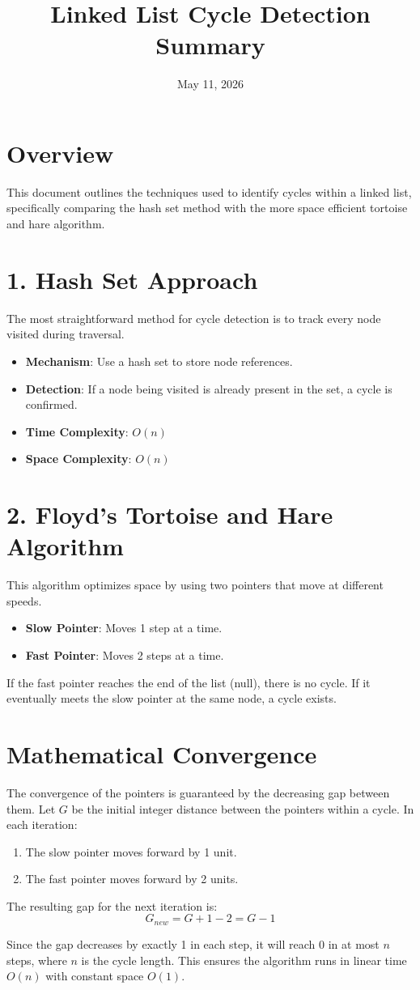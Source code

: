 \documentclass{article}
\begin{document}
\title{Linked List Cycle Detection Summary}
\author{}
\date{May 11, 2026}
\maketitle

\section*{Overview}
This document outlines the techniques used to identify cycles within a linked list, specifically comparing the hash set method with the more space efficient tortoise and hare algorithm.

\section*{1. Hash Set Approach}
The most straightforward method for cycle detection is to track every node visited during traversal.
\begin{itemize}
    \item \textbf{Mechanism}: Use a hash set to store node references.
    \item \textbf{Detection}: If a node being visited is already present in the set, a cycle is confirmed.
    \item \textbf{Time Complexity}: $O(n)$
    \item \textbf{Space Complexity}: $O(n)$
\end{itemize}

\section*{2. Floyd's Tortoise and Hare Algorithm}
This algorithm optimizes space by using two pointers that move at different speeds.
\begin{itemize}
    \item \textbf{Slow Pointer}: Moves 1 step at a time.
    \item \textbf{Fast Pointer}: Moves 2 steps at a time.
\end{itemize}
If the fast pointer reaches the end of the list (null), there is no cycle. If it eventually meets the slow pointer at the same node, a cycle exists.

\section*{Mathematical Convergence}
The convergence of the pointers is guaranteed by the decreasing gap between them. Let $G$ be the initial integer distance between the pointers within a cycle. In each iteration:
\begin{enumerate}
    \item The slow pointer moves forward by 1 unit.
    \item The fast pointer moves forward by 2 units.
\end{enumerate}

The resulting gap for the next iteration is:
\[ G_{new} = G + 1 - 2 = G - 1 \]

Since the gap decreases by exactly 1 in each step, it will reach 0 in at most $n$ steps, where $n$ is the cycle length. This ensures the algorithm runs in linear time $O(n)$ with constant space $O(1)$.
\end{document}
